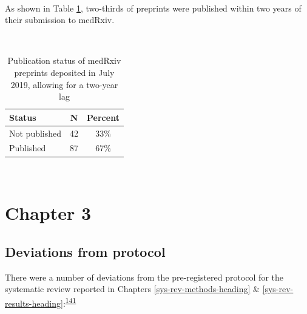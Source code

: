 \documentclass[a4paper, twoside]{templates/ociamthesis}
\begin{document}
~

As shown in Table \ref{tab:medRes-table}, two-thirds of preprints were published within two years of their submission to medRxiv.

~





\begin{table}[H]

\caption[Publication status of medRxiv preprints]{\label{tab:medRes-table}Publication status of medRxiv preprints deposited in July 2019, allowing for a two-year lag}
\centering
\begin{tabular}[t]{lcc}
\toprule
\textbf{Status} & \textbf{N} & \textbf{Percent}\\
\midrule
Not published & 42 & 33\%\\
Published & 87 & 67\%\\
\bottomrule
\end{tabular}
\end{table}

~

\hypertarget{appendix-sys-rev}{%
\section{Chapter 3}\label{appendix-sys-rev}}

\hypertarget{appendix-sys-rev-deviations}{%
\subsection{Deviations from protocol}\label{appendix-sys-rev-deviations}}

There were a number of deviations from the pre-registered protocol for the systematic review reported in Chapters \ref{sys-rev-methods-heading} \& \ref{sys-rev-results-heading}:\textsuperscript{\protect\hyperlink{ref-mcguinnessluke2020}{141}}
\end{document}
